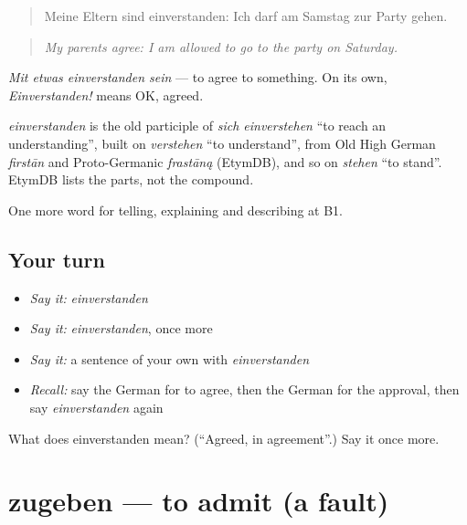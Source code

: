 \begin{quote}
Meine Eltern sind einverstanden: Ich darf am Samstag zur Party gehen.
\end{quote}

\begin{quote}
\emph{My parents agree: I am allowed to go to the party on Saturday.}
\end{quote}

\emph{Mit etwas einverstanden sein} — to agree to something. On its own, \emph{Einverstanden!} means OK, agreed.

\begin{cousinweb}
\emph{einverstanden} is the old participle of \emph{sich einverstehen} \textquotedblleft{}to reach an understanding\textquotedblright{}, built on \emph{verstehen} \textquotedblleft{}to understand\textquotedblright{}, from Old High German \emph{firstān} and Proto-Germanic \emph{frastāną} (EtymDB), and so on \emph{stehen} \textquotedblleft{}to stand\textquotedblright{}. EtymDB lists the parts, not the compound.
\end{cousinweb}

\begin{grammarlens}[title={What you've built}]
One more word for telling, explaining and describing at B1.
\end{grammarlens}

\subsection*{Your turn}
\begin{itemize}
\raggedright
  \item \emph{Say it:} \emph{einverstanden}
  \item \emph{Say it:} \emph{einverstanden}, once more
  \item \emph{Say it:} a sentence of your own with \emph{einverstanden}
  \item \emph{Recall:} say the German for to agree, then the German for the approval, then say \emph{einverstanden} again
\end{itemize}

\begin{tcolorbox}[breakable,colback=teal!4,colframe=teal!35!black,title={Before you move on}]
What does einverstanden mean? (\textquotedblleft{}Agreed, in agreement\textquotedblright{}.) Say it once more.
\end{tcolorbox}
\section[zugeben]{zugeben — to admit (a fault)}

